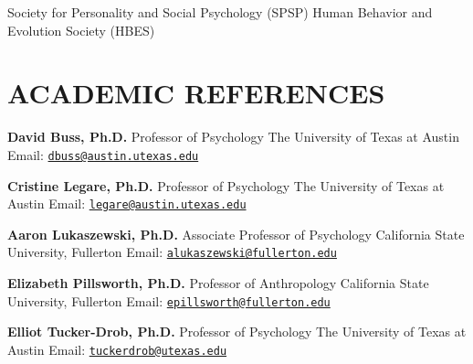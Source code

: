 \documentclass[10pt,]{article}
\begin{document}
Society for Personality and Social Psychology (SPSP) \newline Human
Behavior and Evolution Society (HBES)

\newpage

\section{ACADEMIC REFERENCES}\label{academic-references}

\textbf{David Buss, Ph.D.} \newline Professor of Psychology \newline The
University of Texas at Austin \newline Email:
\href{mailto:dbuss@austin.utexas.edu}{\nolinkurl{dbuss@austin.utexas.edu}}

\textbf{Cristine Legare, Ph.D.} \newline Professor of Psychology
\newline The University of Texas at Austin \newline Email:
\href{mailto:legare@austin.utexas.edu}{\nolinkurl{legare@austin.utexas.edu}}

\textbf{Aaron Lukaszewski, Ph.D.} \newline Associate Professor of
Psychology \newline California State University, Fullerton \newline
Email:
\href{mailto:alukaszewski@fullerton.edu}{\nolinkurl{alukaszewski@fullerton.edu}}

\textbf{Elizabeth Pillsworth, Ph.D.} \newline Professor of Anthropology
\newline California State University, Fullerton \newline Email:
\href{mailto:epillsworth@fullerton.edu}{\nolinkurl{epillsworth@fullerton.edu}}

\textbf{Elliot Tucker-Drob, Ph.D.} \newline Professor of Psychology
\newline The University of Texas at Austin \newline Email:
\href{mailto:tuckerdrob@utexas.edu}{\nolinkurl{tuckerdrob@utexas.edu}}
\end{document}
